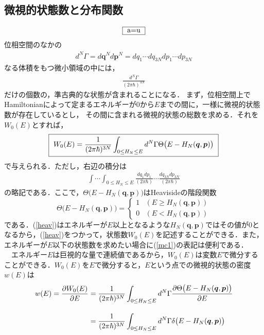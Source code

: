 %
\subsection{微視的状態数と分布関数}
\begin{align}
\fbox{
a=u
}
\end{align}
位相空間のなかの
\begin{align}
d^N\Gamma=d\bm{q}^Nd\bm{p}^N=dq_1\cdots dq_{3N}dp_1\cdots dp_{3N}
\end{align}
なる体積をもつ微小領域の中には，
\begin{align}
\frac{d^N\Gamma}{(2\pi\hbar)^{3N}}
\end{align}
だけの個数の，準古典的な状態が含まれることになる．
まず，位相空間上でHamiltonianによって定まるエネルギーが$0$から$E$までの間に，一様に微視的状態数が存在しているとし，
その間に含まれる微視的状態の総数を求める．それを$W_0(E)$とすれば，
\begin{align}
\label{mc1}
\fbox{
$W_0(E)=\dfrac{1}{(2\pi\hbar)^{3N}}\displaystyle\int_{0\leq H_N\leq E}d^N\Gamma\Theta\bigl(E-H_N(\bm{q},\bm{p})\bigr)$
}
\end{align}
で与えられる．ただし，右辺の積分は
\begin{align}
\int\cdots\int_{0\leq H_N\leq E}\frac{dq_1dp_1}{(2\pi\hbar)}\cdots\frac{dq_{3N}dp_{3N}}{(2\pi\hbar)}
\end{align}
の略記である．ここで，$\Theta\bigl(E-H_N(\bm{q},\bm{p})\bigr)$はHeavisideの階段関数
　\begin{equation}\label{heav}
\Theta\bigl(E-H_N(\bm{q},\bm{p})\bigr)
  = \begin{cases}
      1  & (E\geq H_N(\bm{q},\bm{p}))\\[15pt]
      0 & (E<H_N(\bm{q},\bm{p}))
    \end{cases}
\end{equation}
である．(\ref{heav})はエネルギーが$E$以上となるような$H_N(\bm{q},\bm{p})$ではその値が0となるから，(\ref{heav})をつかって，状態数$W_0(E)$を記述することができる．また，エネルギーが$E$以下の状態数を求めたい場合に(\ref{mc1})の表記は便利である．\\
%
　エネルギー$E$は巨視的な量で連続値であるから，$W_0(E)$は変数$E$で微分することができる．$W_0(E)$を$E$で微分すると，$E$という点での微視的状態の密度$w(E)$は
\begin{align}
\label{mc2}
w(E)=\frac{\partial W_0(E)}{\partial E}
&=
\dfrac{1}{(2\pi\hbar)^{3N}}\int_{0\leq H_N\leq E}d^N\Gamma
\frac{\partial\Theta\bigl(E-H_N(\bm{q},\bm{p})\bigr)}{\partial E}\notag\\[10pt]
&=
\dfrac{1}{(2\pi\hbar)^{3N}}\int_{0\leq H_N\leq E}d^N\Gamma
\delta\bigl(E-H_N(\bm{q},\bm{p})\bigr)
\end{align}
